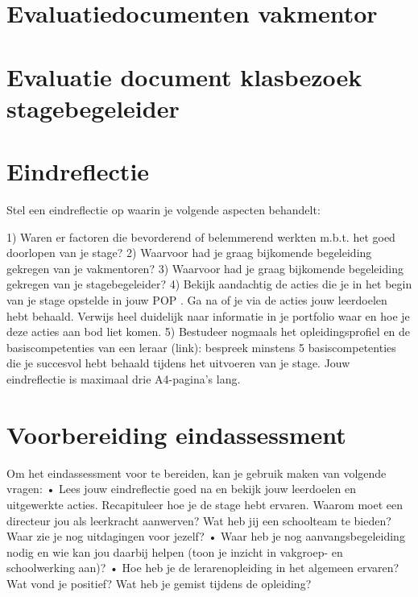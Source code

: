 \documentclass[a4paper,12pt,twoside]{article}%
\begin{document}
\section{Evaluatiedocumenten vakmentor}

\section{Evaluatie document klasbezoek stagebegeleider}

\section{Eindreflectie}
Stel een eindreflectie op waarin je volgende aspecten behandelt: 

1) Waren er factoren die bevorderend of belemmerend werkten m.b.t. het goed doorlopen van je stage? 
2) Waarvoor had je graag bijkomende begeleiding gekregen van je vakmentoren? 
3) Waarvoor had je graag bijkomende begeleiding gekregen van je stagebegeleider? 
4) Bekijk aandachtig de acties die je in het begin van je stage opstelde in jouw POP . Ga na of je via de acties jouw leerdoelen hebt behaald. Verwijs heel duidelijk naar informatie in je portfolio waar en hoe je deze acties aan bod liet komen. 
5)  Bestudeer nogmaals het opleidingsprofiel en de basiscompetenties van een leraar (link):  bespreek minstens 5 basiscompetenties die je succesvol hebt behaald tijdens het uitvoeren van je stage. 
Jouw eindreflectie is maximaal drie A4-pagina’s lang. 



\section{Voorbereiding eindassessment}

Om het eindassessment voor te bereiden, kan je gebruik maken van volgende vragen:
• Lees jouw eindreflectie goed na en bekijk jouw leerdoelen en uitgewerkte acties. Recapituleer hoe je de stage hebt ervaren. Waarom moet een directeur jou als leerkracht aanwerven? Wat heb jij een schoolteam te bieden? Waar zie je nog uitdagingen voor jezelf? 
• Waar heb je nog aanvangsbegeleiding nodig en wie kan jou daarbij helpen (toon je inzicht in vakgroep- en schoolwerking aan)?
• Hoe heb je de lerarenopleiding in het algemeen ervaren? Wat vond je positief? Wat heb je gemist tijdens de opleiding? 






 
\end{document}

